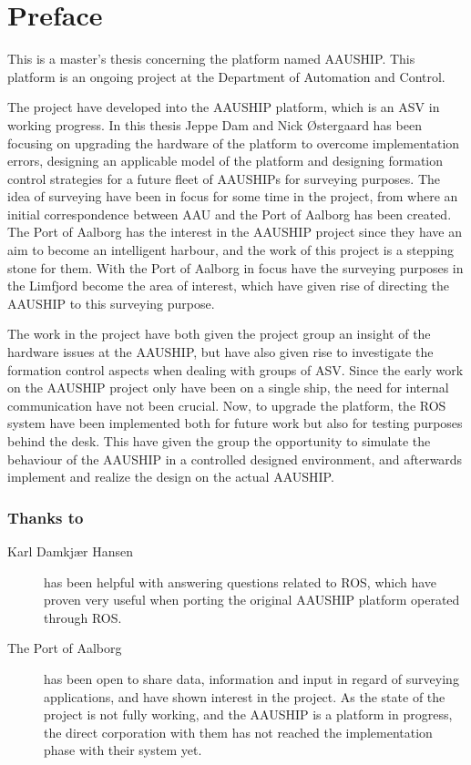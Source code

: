 \chapter{Preface}
This is a master's thesis concerning the platform named AAUSHIP. This
platform is an ongoing project at the Department of Automation and
Control.

The project have developed into the AAUSHIP platform, which is an
\ac{ASV} in working progress. In this thesis Jeppe Dam and Nick
Østergaard has been focusing on upgrading the hardware of the platform to
overcome implementation errors, designing an applicable model of the
platform and designing formation control strategies for a future fleet
of AAUSHIPs for surveying purposes. The idea of surveying have been in
focus for some time in the project, from where an initial
correspondence between \acf{AAU} and the Port of Aalborg has been
created. The Port of Aalborg has the interest in the AAUSHIP project
since they have an aim to become an intelligent harbour, and the work
of this project is a stepping stone for them. With the Port of Aalborg
in focus have the surveying purposes in the Limfjord become the area
of interest, which have given rise of directing the AAUSHIP to this
surveying purpose.

The work in the project have both given the project group an insight
of the hardware issues at the AAUSHIP, but have also given rise to
investigate the formation control aspects when dealing with groups of
\ac{ASV}. Since the early work on the AAUSHIP project only have been
on a single ship, the need for internal communication have not been
crucial. Now, to upgrade the platform, the ROS system have been
implemented both for future work but also for testing purposes behind
the desk. This have given the group the opportunity to simulate the
behaviour of the AAUSHIP in a controlled designed environment, and
afterwards implement and realize the design on the actual AAUSHIP.
\newpage

\subsection*{Thanks to}
\begin{description}
\item[Karl Damkjær Hansen] has been helpful with answering questions
	related to ROS, which have proven very useful when
	porting the original AAUSHIP platform operated through ROS. 
\item[The Port of Aalborg] has been open to share data, information and
	input in regard of surveying applications, and have shown interest in
	the project. As the state of the project is not fully working,
	and the AAUSHIP is a platform in progress, the direct corporation
	with them has not reached the implementation phase with their system
	yet.  
\end{description}


